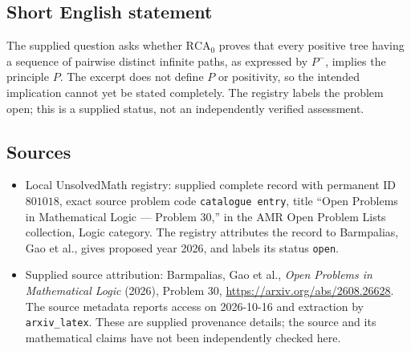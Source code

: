 \documentclass[11pt]{article}
\begin{document}
\subsection{Short English statement}
The supplied question asks whether \(\mathrm{RCA}_0\) proves that every positive tree having a sequence of pairwise distinct infinite paths, as expressed by \(P^-\), implies the principle \(P\). The excerpt does not define \(P\) or positivity, so the intended implication cannot yet be stated completely. The registry labels the problem open; this is a supplied status, not an independently verified assessment.
\subsection{Sources}
\begin{itemize}
\item Local UnsolvedMath registry: supplied complete record with permanent ID \(801018\), exact source problem code \texttt{catalogue entry}, title ``Open Problems in Mathematical Logic --- Problem 30,'' in the AMR Open Problem Lists collection, Logic category. The registry attributes the record to Barmpalias, Gao et al., gives proposed year 2026, and labels its status \texttt{open}.
\item Supplied source attribution: Barmpalias, Gao et al., \emph{Open Problems in Mathematical Logic} (2026), Problem 30, \url{https://arxiv.org/abs/2608.26628}. The source metadata reports access on 2026-10-16 and extraction by \texttt{arxiv\_latex}. These are supplied provenance details; the source and its mathematical claims have not been independently checked here.
\end{itemize}
\end{document}
